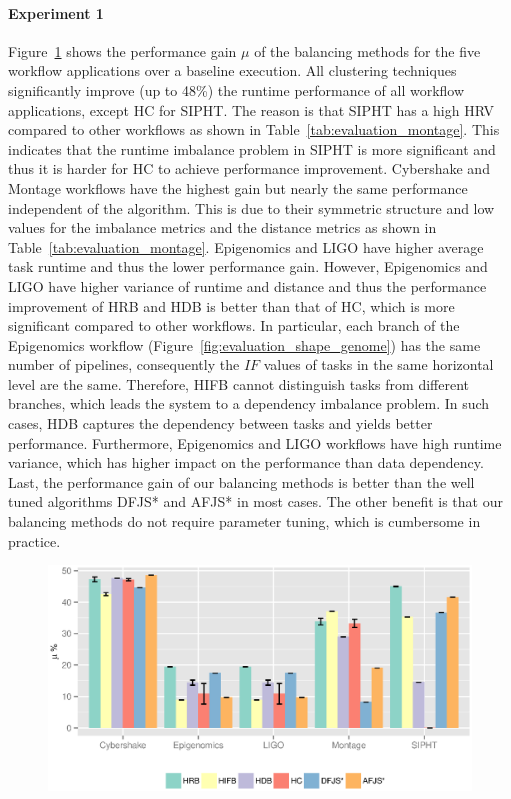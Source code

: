 \documentclass[final,5p,times,twocolumn]{elsarticle}
\begin{document}
\paragraph{\textbf{Experiment 1}}
Figure~\ref{fig:evaluation_algorithm} shows the performance gain $\mu$ of the balancing methods for the five workflow applications over a baseline execution. All clustering techniques significantly improve (up to 48\%) the runtime performance of all workflow applications, except HC for SIPHT. The reason is that SIPHT has a high HRV compared to other workflows as shown in Table~\ref{tab:evaluation_montage}. This indicates that the runtime imbalance problem in SIPHT is more significant and thus it is harder for HC to achieve performance improvement. Cybershake and Montage workflows have the highest gain but nearly the same performance independent of the algorithm. This is due to their symmetric structure and low values for the imbalance metrics and the distance metrics as shown in Table~\ref{tab:evaluation_montage}. 
Epigenomics and LIGO have higher average task runtime and thus the lower performance gain. However, Epigenomics and LIGO have higher variance of runtime and distance and thus the performance improvement of HRB and HDB is better than that of HC, which is more significant compared to other workflows. 
In particular, each branch of the Epigenomics workflow (Figure~\ref{fig:evaluation_shape_genome}) has the same number of pipelines, consequently the $IF$ values of tasks in the same horizontal level are the same. Therefore, HIFB cannot distinguish tasks from different branches, which leads the system to a dependency imbalance problem. In such cases, HDB captures the dependency between tasks and yields better performance. Furthermore, Epigenomics and LIGO workflows have high runtime variance, which has higher impact on the performance than data dependency. Last, the performance gain of our balancing methods is better than the well tuned algorithms DFJS* and AFJS* in most cases. The other benefit is that our balancing methods do not require parameter tuning, which is cumbersome in practice. 

\begin{figure}[htb]
	\centering
	\includegraphics[width=1.0\linewidth]{figure20.eps}
	\label{fig:evaluation_algorithm}
\end{figure}
\end{document}
